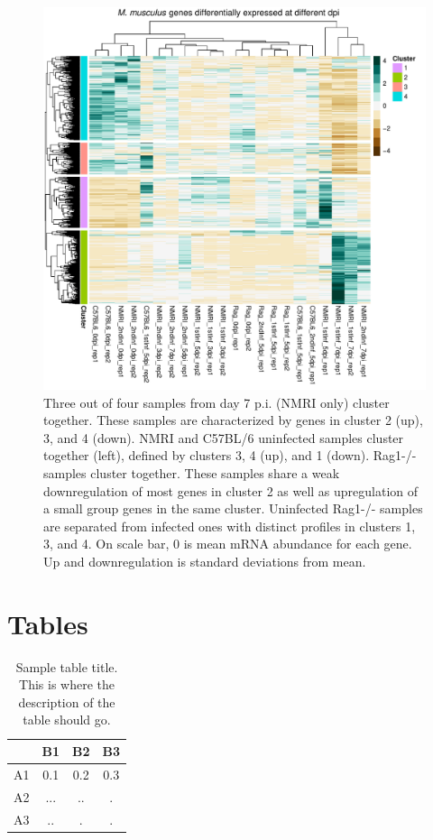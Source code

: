 \documentclass{bmcart}
\begin{document}
\begin{backmatter}
\begin{figure}[h!]
  \includegraphics[width=0.7\linewidth]{mm-heatmap}
  \caption{
Three out of four samples from day 7 p.i. (NMRI only) cluster together. These samples are characterized by genes in cluster 2 (up), 3, and 4 (down). NMRI and C57BL/6 uninfected samples cluster together (left), defined by clusters 3, 4 (up), and 1 (down). Rag1-/- samples cluster together. These samples share a weak downregulation of most genes in cluster 2 as well as upregulation of a small group genes in the same cluster. Uninfected Rag1-/- samples are separated from infected ones with distinct profiles in clusters 1, 3, and 4. On scale bar, 0 is mean mRNA abundance for each gene. Up and downregulation is standard deviations from mean.}
      \end{figure}



\section*{Tables}
\begin{table}[h!]
\caption{Sample table title. This is where the description of the table should go.}
      \begin{tabular}{cccc}
        \hline
           & B1  &B2   & B3\\ \hline
        A1 & 0.1 & 0.2 & 0.3\\
        A2 & ... & ..  & .\\
        A3 & ..  & .   & .\\ \hline
      \end{tabular}
\end{table}


\end{backmatter}
\end{document}
